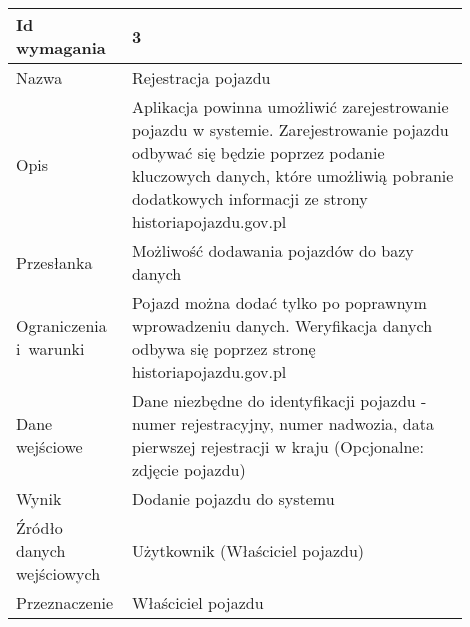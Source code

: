 \documentclass[12pt]{article}
\begin{document}
\begin{table}[H]
\begin{center}
	\begin{tabular}{|p{0.18\linewidth}|p{0.72\linewidth}|}%
	\hline
	Id wymagania 	& 3 				\\ \hline
	Nazwa			& Rejestracja pojazdu \\ \hline
	Opis & Aplikacja powinna umożliwić zarejestrowanie pojazdu w systemie. Zarejestrowanie pojazdu odbywać się będzie poprzez podanie kluczowych danych, które umożliwią pobranie dodatkowych informacji ze strony historiapojazdu.gov.pl
\\ \hline
	Przesłanka & Możliwość dodawania pojazdów do bazy danych  \\ \hline
	Ograniczenia i~warunki & Pojazd można dodać tylko po poprawnym wprowadzeniu danych. Weryfikacja danych odbywa się poprzez stronę historiapojazdu.gov.pl  \\ \hline
	Dane wejściowe &
Dane niezbędne do identyfikacji pojazdu - numer rejestracyjny, numer nadwozia, data pierwszej rejestracji w kraju
(Opcjonalne: zdjęcie pojazdu)  \\ \hline
	Wynik & Dodanie pojazdu do systemu \\ \hline
	Źródło danych wejściowych & Użytkownik (Właściciel pojazdu) \\ \hline
	Przeznaczenie & Właściciel pojazdu \\ \hline
	\end{tabular}

\end{center}
\end{table}
\end{document}
